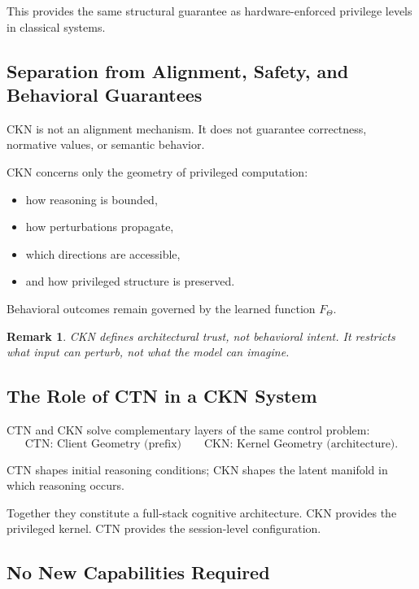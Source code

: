 \documentclass[11pt,a4paper]{article}
\newtheorem*{remark}{Remark}
\begin{document}
This provides the same structural guarantee as hardware-enforced privilege levels in classical systems.

\subsection{Separation from Alignment, Safety, and Behavioral Guarantees}

CKN is not an alignment mechanism. It does not guarantee correctness, normative values, or semantic behavior.

CKN concerns only the geometry of privileged computation:
\begin{itemize}
    \item how reasoning is bounded,
    \item how perturbations propagate,
    \item which directions are accessible,
    \item and how privileged structure is preserved.
\end{itemize}

Behavioral outcomes remain governed by the learned function $F_\Theta$.

\begin{remark}
CKN defines architectural trust, not behavioral intent. It restricts what input can perturb, not what the model can imagine.
\end{remark}

\subsection{The Role of CTN in a CKN System}

CTN and CKN solve complementary layers of the same control problem:
\[
\text{CTN: Client Geometry (prefix)} \qquad \text{CKN: Kernel Geometry (architecture)}.
\]

CTN shapes initial reasoning conditions; CKN shapes the latent manifold in which reasoning occurs.

Together they constitute a full-stack cognitive architecture. CKN provides the privileged kernel. CTN provides the session-level configuration.

\subsection{No New Capabilities Required}
\end{document}
